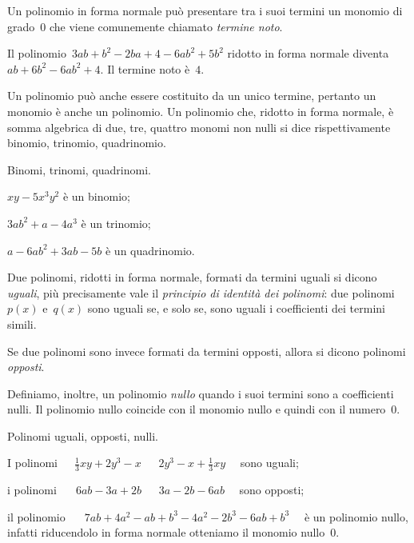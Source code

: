 Un polinomio in forma normale può presentare tra i suoi termini un monomio 
di grado~0 che viene
comunemente chiamato \emph{termine noto}.

\begin{exrig}
\begin{esempio}
Il polinomio~\(3ab+b^2-2ba+4-6ab^2+5b^2\) ridotto in forma normale 
diventa~\(ab+6b^2-6ab^2+4\). Il termine noto è~\(4\).
\end{esempio}
\end{exrig}


Un polinomio può anche essere costituito da un unico termine, pertanto un 
monomio è anche un polinomio.
Un polinomio che, ridotto in forma normale, è somma algebrica di due, tre, 
quattro monomi non nulli si dice
rispettivamente binomio, trinomio, quadrinomio.

\begin{exrig}
\begin{esempio}
Binomi, trinomi, quadrinomi.
\begin{enumeratea}
\item \(xy-5x^3y^2\) è un binomio;
\item \(3ab^2 +a-4a^3\) è un trinomio;
\item \(a-6ab^2+3ab-5b\) è un quadrinomio.
\end{enumeratea}
\end{esempio}
\end{exrig}

\begin{definizione}
Due polinomi, ridotti in forma normale, formati da termini uguali si dicono 
\emph{uguali}, più precisamente vale il \emph{principio di identità dei 
polinomi}:
due polinomi~\(p(x)\) e~\(q(x)\) sono uguali se, e solo se, sono uguali
i coefficienti dei termini simili.

Se due polinomi sono invece formati da termini opposti, allora si dicono 
polinomi \emph{opposti}.

Definiamo, inoltre, un polinomio \emph{nullo} quando i suoi termini sono a 
coefficienti nulli. Il polinomio nullo
coincide con il monomio nullo e quindi con il numero~0.
\end{definizione}

\begin{exrig}
\begin{esempio}
Polinomi uguali, opposti, nulli.
\begin{enumeratea}
\item I polinomi~\(\quad \frac{1}{3}xy+2y^3-x\) \(\quad~2y^3-x+\frac{1}{3}xy 
\quad\) sono uguali;
\item i polinomi~\(\quad~6ab-3a+2b\) \(\quad~3a-2b-6ab \quad\) sono opposti;
\item il polinomio~\(\quad~7ab+4a^2-ab+b^3-4a^2-2b^3-6ab+b^3 \quad\) è un 
polinomio nullo, infatti riducendolo in forma normale otteniamo il monomio 
nullo~\(0\).
\end{enumeratea}
\end{esempio}
\end{exrig}

